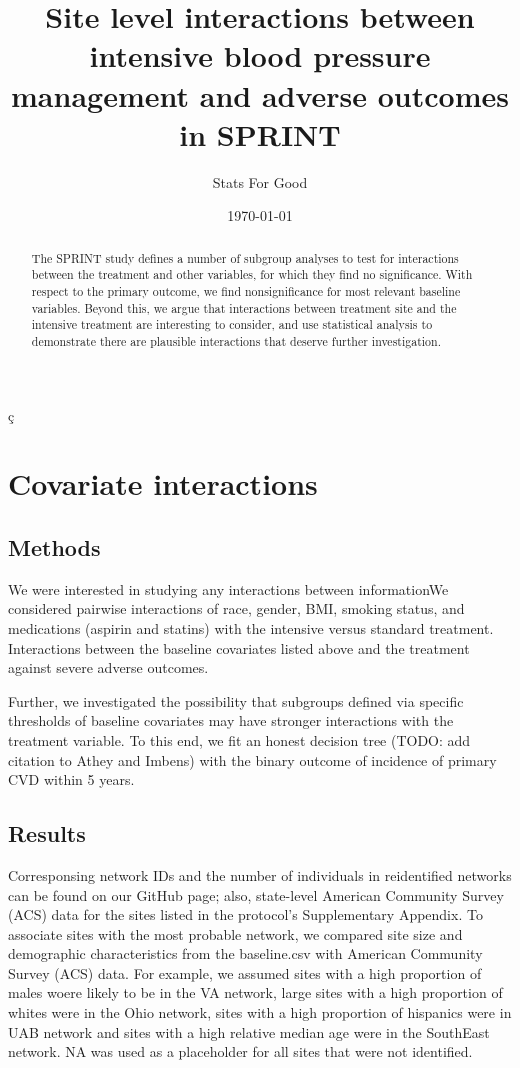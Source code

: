 ç\documentclass[10pt]{article}
\title{\vspace{-2em}Site level interactions between intensive blood pressure management and
  adverse outcomes in SPRINT}
\author{Stats For Good}
\date{\today}
\begin{document}
 \maketitle

\begin{abstract}
  The SPRINT study defines a number of subgroup analyses to test for
  interactions between the treatment and other variables, for which they find no
  significance. With respect to the primary outcome, we find nonsignificance
  for most relevant baseline variables. Beyond this, we argue that interactions
  between treatment site and the intensive treatment are interesting to
  consider, and use statistical analysis to demonstrate there are plausible
  interactions that deserve further investigation. 
\end{abstract}

\section{Covariate interactions}
\subsection{Methods}
We were interested in studying any interactions between informationWe considered pairwise interactions of race, gender, BMI, smoking status, and
medications (aspirin and statins) with the intensive versus standard
treatment. Interactions between the baseline covariates listed above and the treatment
against severe adverse outcomes.

Further, we investigated the possibility that subgroups defined via specific
thresholds of baseline covariates may have stronger interactions with the
treatment variable. To this end, we fit an honest decision tree (TODO: add
citation to Athey and Imbens) with the binary outcome of incidence of primary
CVD within 5 years.

\subsection{Results}
Corresponsing network IDs and the number of individuals in reidentified networks
can be found on our GitHub page; also, state-level American Community Survey (ACS)
data for the sites listed in the protocol's Supplementary Appendix. To associate
sites with the most probable network, we compared site size and demographic
characteristics from the baseline.csv with American Community Survey
(ACS) data.  For example, we assumed sites with a high proportion of males
woere likely to be in the VA network, large sites with a high proportion of whites
were in the Ohio network, sites with a high proportion of hispanics
were in UAB network and sites with a high relative median age were in the SouthEast
network.  NA was used as a placeholder for all sites that were not identified.
\end{document}

